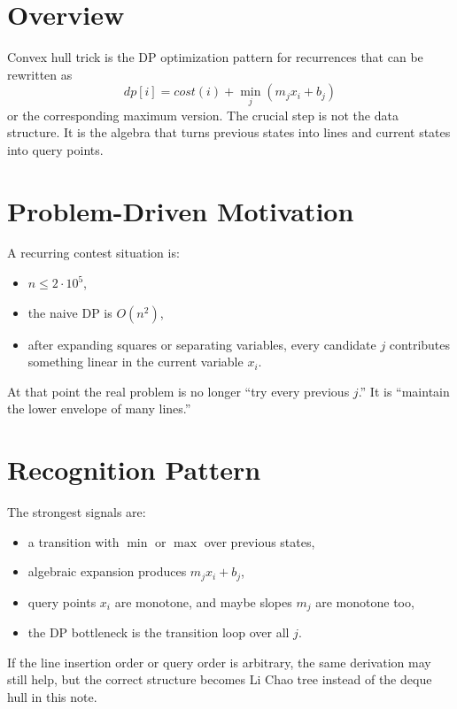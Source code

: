 \section*{Overview}

Convex hull trick is the DP optimization pattern for recurrences that can be rewritten as
\[
dp[i] = cost(i) + \min_j (m_j x_i + b_j)
\]
or the corresponding maximum version. The crucial step is not the data structure. It is the algebra that turns previous
states into lines and current states into query points.

\section*{Problem-Driven Motivation}

A recurring contest situation is:

\begin{itemize}
  \item \(n \le 2 \cdot 10^5\),
  \item the naive DP is \(O(n^2)\),
  \item after expanding squares or separating variables, every candidate \(j\) contributes something linear in the
  current variable \(x_i\).
\end{itemize}

At that point the real problem is no longer ``try every previous \(j\).'' It is ``maintain the lower envelope of many
lines.''

\section*{Recognition Pattern}

The strongest signals are:

\begin{itemize}
  \item a transition with \(\min\) or \(\max\) over previous states,
  \item algebraic expansion produces \(m_j x_i + b_j\),
  \item query points \(x_i\) are monotone, and maybe slopes \(m_j\) are monotone too,
  \item the DP bottleneck is the transition loop over all \(j\).
\end{itemize}

If the line insertion order or query order is arbitrary, the same derivation may still help, but the correct structure
becomes Li Chao tree instead of the deque hull in this note.


